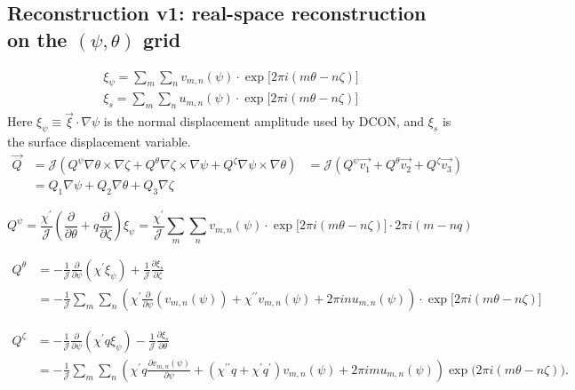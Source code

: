 \documentclass[10pt,a4paper]{article}
\numberwithin{equation}{section}
\begin{document}
\subsection{Reconstruction v1: real-space reconstruction on the $(\psi,\theta)$ grid}
\begin{align}
\xi_\psi = \sum_{m}^{} \sum_{n}^{} v_{m,n}(\psi) \cdot
\exp\!\bigl[2\pi i(m\theta -n\zeta)\bigr] \\
\xi_s = \sum_{m}^{} \sum_{n}^{} u_{m,n}(\psi) \cdot
\exp\!\bigl[2\pi i(m\theta -n\zeta)\bigr]
\end{align}
Here $\xi_\psi\equiv\vec\xi\cdot\nabla\psi$ is the normal displacement amplitude used by DCON, and $\xi_s$ is the surface displacement variable.
\begin{align}
\vec{Q} &= \mathcal{J} (Q^{\psi} \nabla \theta \times \nabla \zeta + Q^{\theta} \nabla \zeta \times \nabla \psi + Q^{\zeta} \nabla \psi \times \nabla \theta) &= \mathcal{J} ( Q^{\psi} \vec{v_1} + Q^{\theta} \vec{v_2} + Q^{\zeta} \vec{v_3}) \\
&= Q_1 \nabla \psi + Q_2 \nabla \theta + Q_3 \nabla \zeta
\end{align}

\begin{equation}
Q^{\psi} = \frac{\chi^\prime}{\mathcal{J}} (\frac{\partial}{\partial \theta} + q \frac{\partial}{\partial \zeta} )\xi_\psi = \frac{\chi^\prime}{\mathcal{J}} \sum_{m}^{} \sum_{n}^{} v_{m,n}(\psi) \cdot \exp\!\bigl[2 \pi i(m\theta -n\zeta)\bigr]\cdot 2 \pi i (m-nq)
\end{equation}

\begin{align}
Q^{\theta} &= - \frac{1}{\mathcal{J}} \frac{\partial}{\partial \psi}(\chi ^ \prime \xi_\psi) + \frac{1}{\mathcal{J}} \frac{\partial \xi_s}{\partial \zeta} \\
&= - \frac{1}{\mathcal{J}} \sum_{m}^{} \sum_{n}^{} \left(\chi ^ \prime \frac{\partial}{\partial \psi}(v_{m,n}(\psi)) + \chi^{\prime\prime}v_{m,n}(\psi) + 2\pi i n u_{m,n}(\psi) \right) \cdot \exp\!\bigl[2\pi i(m\theta -n\zeta)\bigr]
\end{align}

\begin{align}
Q^{\zeta}
&= - \frac{1}{\mathcal{J}} \frac{\partial}{\partial \psi} (\chi^\prime q \xi_\psi)
   -\frac{1}{\mathcal{J}} \frac{\partial \xi_s}{\partial \theta} \\
&= - \frac{1}{\mathcal{J}} \sum_{m} \sum_{n}
   \left( \chi ^ \prime q \frac{\partial v_{m,n}(\psi)}{\partial \psi}
   + (\chi^{\prime\prime}q+\chi^\prime q^\prime) v_{m,n}(\psi)
   + 2\pi i m u_{m,n}(\psi) \right)
   \exp\!\bigl(2 \pi i(m\theta - n\zeta)\bigr).
\end{align}
\end{document}
